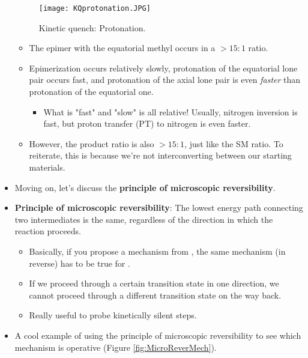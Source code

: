 \documentclass[../notes.tex]{subfiles}
\begin{document}
\begin{itemize}
    \begin{figure}[h!]
        \centering
        \texttt{[image: KQprotonation.JPG]}
        \caption{Kinetic quench: Protonation.}
        \label{fig:KQprotonation}
    \end{figure}
    \begin{itemize}
        \item The epimer with the equatorial methyl occurs in a $>15:1$ ratio.
        \item Epimerization occurs relatively slowly, protonation of the equatorial lone pair occurs fast, and protonation of the axial lone pair is even \emph{faster} than protonation of the equatorial one.
        \begin{itemize}
            \item What is "fast" and "slow" is all relative! Usually, nitrogen inversion is fast, but proton transfer (PT) to nitrogen is even faster.
        \end{itemize}
        \item However, the product ratio is also $>15:1$, just like the SM ratio. To reiterate, this is because we're not interconverting between our starting materials.
    \end{itemize}
    \item Moving on, let's discuss the \textbf{principle of microscopic reversibility}.
    \item \textbf{Principle of microscopic reversibility}: The lowest energy path connecting two intermediates is the same, regardless of the direction in which the reaction proceeds.
    \begin{itemize}
        \item Basically, if you propose a mechanism from , the same mechanism (in reverse) has to be true for .
        \item If we proceed through a certain transition state in one direction, we cannot proceed through a different transition state on the way back.
        \item Really useful to probe kinetically silent steps.
    \end{itemize}
    \item A cool example of using the principle of microscopic reversibility to see which mechanism is operative (Figure \ref{fig:MicroReverMech}).
    \begin{figure}[h!]
        \centering
        \begin{subfigure}[b]{\linewidth}
            \centering

\end{subfigure}
\end{figure}
\end{itemize}
\end{document}
